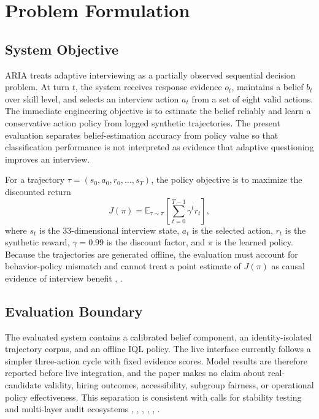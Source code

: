 \documentclass[journal]{IEEEtran}
\begin{document}
\section{Problem Formulation}

\subsection{System Objective}

ARIA treats adaptive interviewing as a partially observed sequential decision problem. At turn $t$, the system receives response evidence $o_t$, maintains a belief $b_t$ over skill level, and selects an interview action $a_t$ from a set of eight valid actions. The immediate engineering objective is to estimate the belief reliably and learn a conservative action policy from logged synthetic trajectories. The present evaluation separates belief-estimation accuracy from policy value so that classification performance is not interpreted as evidence that adaptive questioning improves an interview.


For a trajectory $\tau=(s_0,a_0,r_0,\ldots,s_T)$, the policy objective is to maximize the discounted return
\begin{equation}
J(\pi)=\mathbb{E}_{\tau\sim\pi}\left[\sum_{t=0}^{T-1}\gamma^t r_t\right],
\label{eq:policy-objective}
\end{equation}
where $s_t$ is the 33-dimensional interview state, $a_t$ is the selected action, $r_t$ is the synthetic reward, $\gamma=0.99$ is the discount factor, and $\pi$ is the learned policy. Because the trajectories are generated offline, the evaluation must account for behavior-policy mismatch and cannot treat a point estimate of $J(\pi)$ as causal evidence of interview benefit \cite{thomas2015hcope}, \cite{voloshin2019ope}.

\subsection{Evaluation Boundary}

The evaluated system contains a calibrated belief component, an identity-isolated trajectory corpus, and an offline IQL policy. The live interface currently follows a simpler three-action cycle with fixed evidence scores. Model results are therefore reported before live integration, and the paper makes no claim about real-candidate validity, hiring outcomes, accessibility, subgroup fairness, or operational policy effectiveness. This separation is consistent with calls for stability testing and multi-layer audit ecosystems \cite{rhea2022stability}, \cite{kazim2021audit}, \cite{mihaljevic2023auditing}, \cite{gerchick2025audits}, \cite{costanzachock2022auditors}, \cite{raji2022oversight}.
\end{document}
